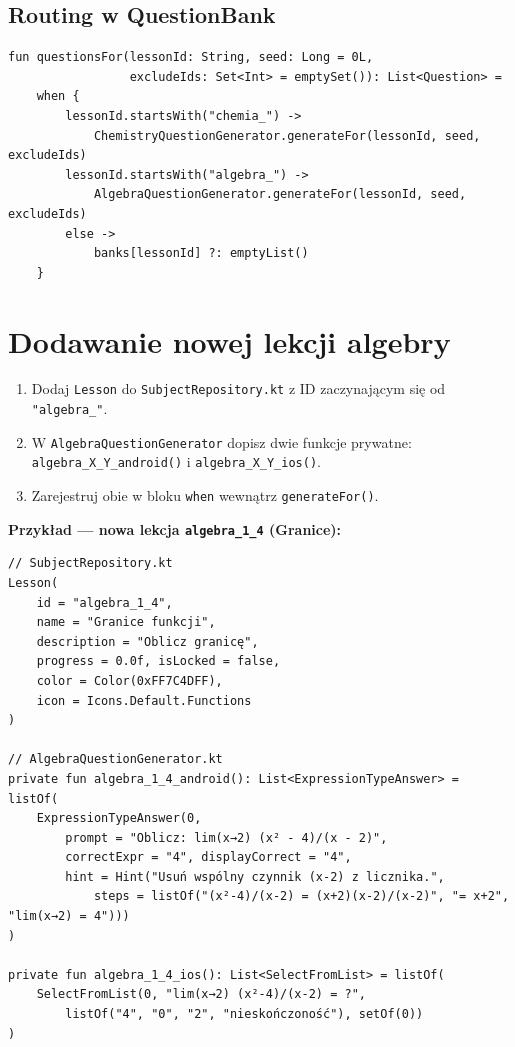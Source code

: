 \documentclass[11pt,a4paper]{article}
\begin{document}
\subsection{Routing w QuestionBank}

\begin{lstlisting}
fun questionsFor(lessonId: String, seed: Long = 0L,
                 excludeIds: Set<Int> = emptySet()): List<Question> =
    when {
        lessonId.startsWith("chemia_") ->
            ChemistryQuestionGenerator.generateFor(lessonId, seed, excludeIds)
        lessonId.startsWith("algebra_") ->
            AlgebraQuestionGenerator.generateFor(lessonId, seed, excludeIds)
        else ->
            banks[lessonId] ?: emptyList()
    }
\end{lstlisting}

\section{Dodawanie nowej lekcji algebry}

\begin{enumerate}
  \item Dodaj \texttt{Lesson} do \texttt{SubjectRepository.kt} z ID
        zaczynającym się od \texttt{"algebra\_"}.
  \item W \texttt{AlgebraQuestionGenerator} dopisz dwie funkcje prywatne:
        \texttt{algebra\_X\_Y\_android()} i \texttt{algebra\_X\_Y\_ios()}.
  \item Zarejestruj obie w bloku \texttt{when} wewnątrz \texttt{generateFor()}.
\end{enumerate}

\textbf{Przykład — nowa lekcja \texttt{algebra\_1\_4} (Granice):}

\begin{lstlisting}
// SubjectRepository.kt
Lesson(
    id = "algebra_1_4",
    name = "Granice funkcji",
    description = "Oblicz granicę",
    progress = 0.0f, isLocked = false,
    color = Color(0xFF7C4DFF),
    icon = Icons.Default.Functions
)

// AlgebraQuestionGenerator.kt
private fun algebra_1_4_android(): List<ExpressionTypeAnswer> = listOf(
    ExpressionTypeAnswer(0,
        prompt = "Oblicz: lim(x→2) (x² - 4)/(x - 2)",
        correctExpr = "4", displayCorrect = "4",
        hint = Hint("Usuń wspólny czynnik (x-2) z licznika.",
            steps = listOf("(x²-4)/(x-2) = (x+2)(x-2)/(x-2)", "= x+2", "lim(x→2) = 4")))
)

private fun algebra_1_4_ios(): List<SelectFromList> = listOf(
    SelectFromList(0, "lim(x→2) (x²-4)/(x-2) = ?",
        listOf("4", "0", "2", "nieskończoność"), setOf(0))
)
\end{lstlisting}
\end{document}
